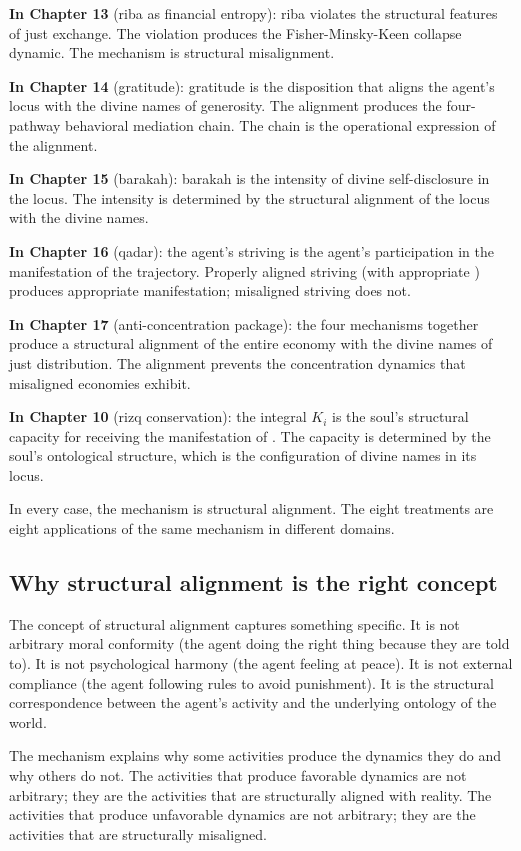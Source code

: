 \textbf{In Chapter 13} (riba as financial entropy): riba violates
the structural features of just exchange. The violation produces
the Fisher-Minsky-Keen collapse dynamic. The mechanism is
structural misalignment.

\textbf{In Chapter 14} (gratitude): gratitude is the disposition
that aligns the agent's locus with the divine names of generosity.
The alignment produces the four-pathway behavioral mediation
chain. The chain is the operational expression of the alignment.

\textbf{In Chapter 15} (barakah): barakah is the intensity of
divine self-disclosure in the locus. The intensity is determined
by the structural alignment of the locus with the divine names.

\textbf{In Chapter 16} (qadar): the agent's striving is the
agent's participation in the manifestation of the trajectory.
Properly aligned striving (with appropriate )
produces appropriate manifestation; misaligned striving does not.

\textbf{In Chapter 17} (anti-concentration package): the four
mechanisms together produce a structural alignment of the entire
economy with the divine names of just distribution. The alignment
prevents the concentration dynamics that misaligned economies
exhibit.

\textbf{In Chapter 10} (rizq conservation): the integral $K_i$ is
the soul's structural capacity for receiving the manifestation
of . The capacity is determined by the soul's
ontological structure, which is the configuration of divine names
in its locus.

In every case, the mechanism is structural alignment. The eight
treatments are eight applications of the same mechanism in
different domains.

\subsection{Why structural alignment is the right concept}

The concept of structural alignment captures something specific.
It is not arbitrary moral conformity (the agent doing the right
thing because they are told to). It is not psychological harmony
(the agent feeling at peace). It is not external compliance (the
agent following rules to avoid punishment). It is the structural
correspondence between the agent's activity and the underlying
ontology of the world.

The mechanism explains why some activities produce the dynamics
they do and why others do not. The activities that produce
favorable dynamics are not arbitrary; they are the activities that
are structurally aligned with reality. The activities that
produce unfavorable dynamics are not arbitrary; they are the
activities that are structurally misaligned.

